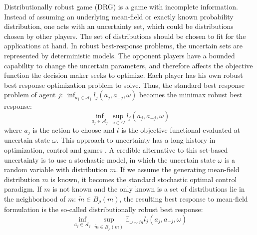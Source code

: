 \documentclass{article}
\begin{document}
Distributionally robust game (DRG) is a game with incomplete information. Instead of assuming an underlying mean-field or exactly known probability distribution, one acts with an uncertainty set, which could be distributions chosen by other players. The set of distributions should be chosen to fit for the applications at hand. In robust best-response problems, the uncertain sets are represented by deterministic models. The opponent players have a bounded capability to change the uncertain parameters, and therefore affects the objective function the decision maker seeks to optimize. Each player has his own robust best response optimization problem to solve. Thus, the standard best response problem of agent $j$: $\inf_{a_j \in \mathcal{A}_j} l_j(a_j,a_{-j},\omega)$ becomes the minimax robust best response:
\begin{equation}
\inf_{a_j\in \mathcal{A}_j} \sup_{\omega \in \Omega} l_j(a_j, a_{-j},\omega)
\end{equation}
where $a_j$ is the action to choose and $l$ is the objective functional evaluated at uncertain state $\omega$. This approach to uncertainty has a long history in optimization, control and games \cite{scarf1957min, sion1958, DBLP:journals/ior/Soyster73}. A credible alternative to this set-based uncertainty is to use a stochastic model, in which the uncertain state $\omega$ is a random variable with distribution $m$. If we assume the generating mean-field distribution $m$ is known, it becomes the standard stochastic optimal control paradigm. If $m$ is not known and the only known is a set of distributions lie in the neighborhood of $m$: $\tilde{m} \in B_{\rho}(m)$, the resulting best response to mean-field formulation is the so-called distributionally robust best response:
\begin{equation}
\inf_{a_j \in \mathcal{A}_j}\sup_{\tilde{m} \in B_{\rho}(m)} \mathbb{E}_{\omega \sim \tilde{m}} l_j(a_j, a_{-j}, \omega)
\end{equation}
\end{document}
